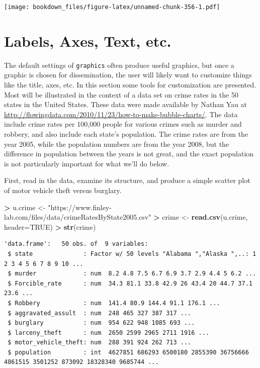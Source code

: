 \documentclass[
]{krantz}
\makeatletter
\newenvironment{Shaded}{\begin{snugshade}}{\end{snugshade}}
\newcommand{\DataTypeTok}[1]{\textcolor[rgb]{0.27,0.27,0.27}{#1}}
\newcommand{\KeywordTok}[1]{\textcolor[rgb]{0.27,0.27,0.27}{\textbf{#1}}}
\newcommand{\NormalTok}[1]{#1}
\newcommand{\OperatorTok}[1]{\textcolor[rgb]{0.43,0.43,0.43}{\textbf{#1}}}
\newcommand{\OtherTok}[1]{\textcolor[rgb]{0.37,0.37,0.37}{#1}}
\newcommand{\StringTok}[1]{\textcolor[rgb]{0.5,0.5,0.5}{#1}}
\newenvironment{kframe}{%
\medskip{}
\setlength{\fboxsep}{.8em}
 \def\at@end@of@kframe{}%
 \ifinner\ifhmode%
  \def\at@end@of@kframe{\end{minipage}}%
  \begin{minipage}{\columnwidth}%
 \fi\fi%
 \def\FrameCommand##1{\hskip\@totalleftmargin \hskip-\fboxsep
 \colorbox{shadecolor}{##1}\hskip-\fboxsep
     \hskip-\linewidth \hskip-\@totalleftmargin \hskip\columnwidth}%
 \MakeFramed {\advance\hsize-\width
   \@totalleftmargin\z@ \linewidth\hsize
   \@setminipage}}%
 {\par\unskip\endMakeFramed%
 \at@end@of@kframe}
\renewenvironment{Shaded}{\begin{kframe}}{\end{kframe}}
\makeatother
\begin{document}
\texttt{[image: bookdown\_files/figure-latex/unnamed-chunk-356-1.pdf]}

\hypertarget{labels-axes-text-etc.-1}{%
\section{Labels, Axes, Text, etc.}\label{labels-axes-text-etc.-1}}

The default settings of \texttt{graphics} often produce useful graphics, but once a graphic is chosen for dissemination, the user will likely want to customize things like the title, axes, etc. In this section some tools for customization are presented. Most will be illustrated in the context of a data set on crime rates in the 50 states in the United States. These data were made available by Nathan Yau at \url{http://flowingdata.com/2010/11/23/how-to-make-bubble-charts/}. The data include crime rates per 100,000 people for various crimes such as murder and robbery, and also include each state's population. The crime rates are from the year 2005, while the population numbers are from the year 2008, but the difference in population between the years is not great, and the exact population is not particularly important for what we'll do below.

First, read in the data, examine its structure, and produce a simple scatter plot of motor vehicle theft versus burglary.

\begin{Shaded}
\begin{Highlighting}[]
\OperatorTok{\textgreater{}}\StringTok{ }\NormalTok{u.crime \textless{}{-}}\StringTok{ "https://www.finley{-}lab.com/files/data/crimeRatesByState2005.csv"}
\OperatorTok{\textgreater{}}\StringTok{ }\NormalTok{crime \textless{}{-}}\StringTok{ }\KeywordTok{read.csv}\NormalTok{(u.crime, }\DataTypeTok{header=}\OtherTok{TRUE}\NormalTok{)}
\OperatorTok{\textgreater{}}\StringTok{ }\KeywordTok{str}\NormalTok{(crime)}
\end{Highlighting}
\end{Shaded}

\begin{verbatim}
'data.frame':   50 obs. of  9 variables:
 $ state              : Factor w/ 50 levels "Alabama ","Alaska ",..: 1 2 3 4 5 6 7 8 9 10 ...
 $ murder             : num  8.2 4.8 7.5 6.7 6.9 3.7 2.9 4.4 5 6.2 ...
 $ Forcible_rate      : num  34.3 81.1 33.8 42.9 26 43.4 20 44.7 37.1 23.6 ...
 $ Robbery            : num  141.4 80.9 144.4 91.1 176.1 ...
 $ aggravated_assult  : num  248 465 327 387 317 ...
 $ burglary           : num  954 622 948 1085 693 ...
 $ larceny_theft      : num  2650 2599 2965 2711 1916 ...
 $ motor_vehicle_theft: num  288 391 924 262 713 ...
 $ population         : int  4627851 686293 6500180 2855390 36756666 4861515 3501252 873092 18328340 9685744 ...
\end{verbatim}
\end{document}
